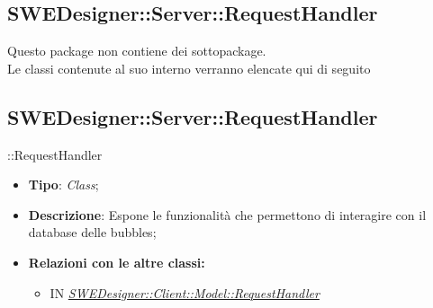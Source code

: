 \documentclass[../SpecificaTecnica.tex]{subfiles}
\begin{document}
			
			\subsection{SWEDesigner::Server::RequestHandler}
			Questo package non contiene dei sottopackage.\\
			Le classi contenute al suo interno verranno elencate qui di seguito
			
			\subsection{SWEDesigner::Server::RequestHandler}::RequestHandler
			\hypertarget{SWEDesigner::Server::RequestHandler::RequestHandler}{}
			\begin{itemize}
				\item \textbf{Tipo}: \emph{Class};
				\item \textbf{Descrizione}: Espone le funzionalità che permettono di interagire con il database delle bubbles; \\
				\item \textbf{Relazioni con le altre classi:}
				\begin{itemize}
					\item IN \hyperlink{SWEDesigner::Client::Model::RequestHandler}{\emph{SWEDesigner::Client::Model::RequestHandler}}
				\end{itemize}	
			\end{itemize}
\end{document}
